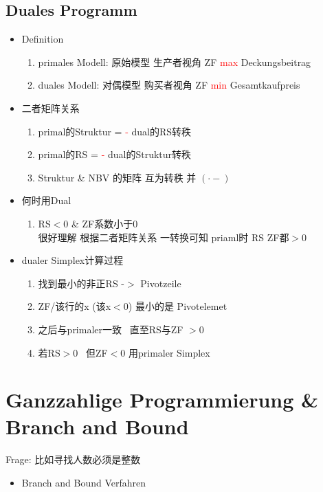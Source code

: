 \documentclass[12pt, letterpaper]{article}
\begin{document}
\begin{CJK*}{UTF8}{gbsn}
\subsection{Duales Programm}
\begin{itemize}
\item Definition
\begin{enumerate}
\item primales Modell: 原始模型 生产者视角 ZF \textcolor{red}{max} Deckungsbeitrag
\item duales Modell: 对偶模型 购买者视角 ZF \textcolor{red}{min} Gesamtkaufpreis
\end{enumerate}


\item 二者矩阵关系
\begin{enumerate}
\item primal的Struktur = \textcolor{red}{-} dual的RS转秩
\item primal的RS = \textcolor{red}{-} dual的Struktur转秩
\item Struktur \& NBV 的矩阵 互为转秩 并 $(\cdot -)$

\end{enumerate}

\item 何时用Dual
\begin{enumerate}
\item RS$<$0 \& ZF系数小于0
\\很好理解 根据二者矩阵关系 一转换可知 priaml时 RS ZF都$>$0

\end{enumerate}

\item dualer Simplex计算过程
\begin{enumerate}
\item 找到最小的非正RS -$>$ Pivotzeile
\item ZF/该行的x (该x$<0$) 最小的是 Pivotelemet
\item 之后与primaler一致 \ 直至RS与ZF $>0$
\item 若RS$>$0 \ 但ZF$<$0 用primaler Simplex
\end{enumerate}
\end{itemize}


\newpage
\section{Ganzzahlige Programmierung \& Branch and Bound}
Frage: 比如寻找人数必须是整数

\begin{itemize}
\item Branch and Bound Verfahren


\end{itemize}
\end{CJK*}
\end{document}

